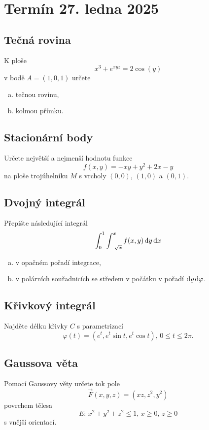 \section{Termín 27. ledna 2025}

\subsection{Tečná rovina}
K ploše
\[
    x^3 + e^{xyz} = 2 \cos(y)
\]
v bodě $A = (1, 0, 1)$ určete
\begin{enumerate}[(a),noitemsep]
    \item tečnou rovinu,
    \item kolmou přímku.
\end{enumerate}

\subsection{Stacionární body}
Určete největší a nejmenší hodnotu funkce
\[
    f(x,y) = -xy + y^2 + 2x - y
\]
na ploše trojúhelníku $M$ s vrcholy $(0, 0)$, $(1, 0)$ a $(0, 1)$.

\subsection{Dvojný integrál}
Přepište následující integrál
\[
    \int_{0}^{1} \int_{-\sqrt{x}}^{x} f(x, y) \mathop{}\!\mathrm{d} y \mathop{}\!\mathrm{d} x
\]
\begin{enumerate}[a), noitemsep]
    \item v opačném pořadí integrace,
    \item v polárních souřadnicích se středem v počátku v pořadí $\mathop{}\!\mathrm{d} \varrho \mathop{}\!\mathrm{d} \varphi$.
\end{enumerate}

\subsection{Křivkový integrál}
Najděte délku křivky $C$ s parametrizací
\[
    \varphi(t) = (e^t, e^t \sin t, e^t \cos t) \text{, } 0 \leq t \leq 2 \pi.
\]

\subsection{Gaussova věta}
Pomocí Gaussovy věty určete tok pole
\[
    \vec{F}(x, y, z) = (xz, z^2, y^2)
\]
povrchem tělesa
\[
    E \text{: } x^2 + y^2 + z^2 \leq 1 \text{, } x \geq 0 \text{, } z \geq 0
\]
s vnější orientací.